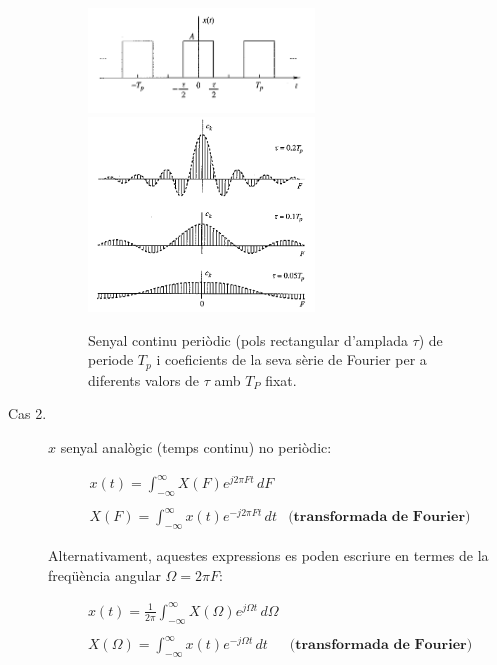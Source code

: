 \documentclass{article}
\begin{document}
\begin{description}
\begin{figure}[htbp]
\begin{center}
\includegraphics[width=6cm]{polsrectper.png} 
$\qquad$
\includegraphics[width=6cm]{sincdiscret1.png} 
\end{center}
\caption{Senyal continu peri\`odic (pols rectangular d'amplada $\tau$) de periode $T_p$ i coeficients de la
seva s\`erie de Fourier per a diferents valors de $\tau$ amb $T_P$ fixat.}
\end{figure}

\newpage

\item[Cas 2.] $x$ senyal anal\`ogic (temps continu) no periòdic:

\[
\begin{array}{ll}
x(t)=\displaystyle \int_{-\infty}^{\infty} X(F) e^{j 2\pi F t} \, dF &  \\ \\
X(F)=\displaystyle \int_{-\infty}^{\infty} x(t) e^{-j 2\pi F t} \, dt & \textbf{(transformada de Fourier)}
\end{array}
\]

\noindent
Alternativament, aquestes expressions es poden escriure en termes de la freq\"u\`encia angular $\Omega=2\pi F$:

\[
\begin{array}{ll}
x(t)=\frac{1}{2\pi} \displaystyle \int_{-\infty}^{\infty} X(\Omega) e^{j \Omega t} \, d\Omega &  \\ \\
X(\Omega)=\displaystyle \int_{-\infty}^{\infty} x(t) e^{-j \Omega t} \, dt & \textbf{(transformada de Fourier)}
\end{array}
\]


\end{description}
\end{document}
